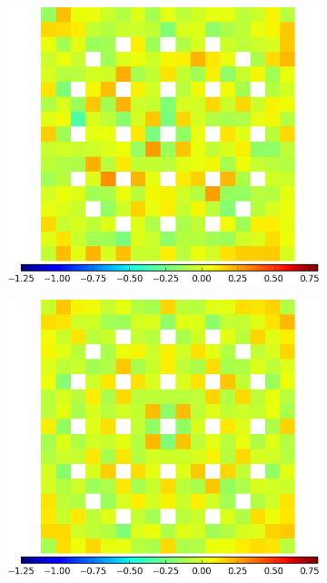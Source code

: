 \begin{figure}[h!]
\begin{subfigure}{0.45\textwidth}
  \includegraphics[width=\linewidth]{figures/results/assm-31/pca-transform/capt-err-degenerate}
  \caption{}
  \label{fig:chap11-assm-3.1-capt-degenerate}
\end{subfigure}
\begin{subfigure}{0.45\textwidth}
  \centering
  \includegraphics[width=\linewidth]{figures/results/assm-31/pca-transform/capt-err-lns}
  \caption{}
  \label{fig:chap11-assm-3.1-capt-lns}

\end{subfigure}
\end{figure}
